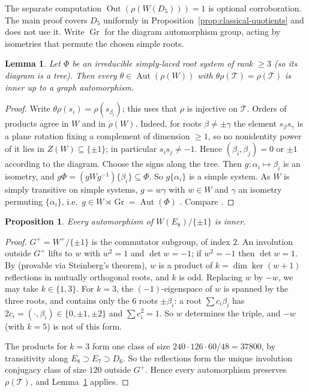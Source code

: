 \documentclass[11pt]{article}
\newtheorem{lemma}[theorem]{Lemma}
\newtheorem{proposition}[theorem]{Proposition}
\theoremstyle{definition}
\newcommand{\T}{\mathcal{T}}
\newcommand{\Aut}{\operatorname{Aut}}
\newcommand{\Out}{\operatorname{Out}}
\newcommand{\Gr}{\operatorname{Gr}}
\begin{document}
The separate computation $\Out(\rho(W(D_5)))=1$ is optional corroboration.
The main proof covers $D_5$ uniformly in Proposition~\ref{prop:classical-quotients} and does not use it.
Write $\Gr$ for the diagram automorphism group, acting by isometries that permute the chosen simple roots.

\begin{lemma}\label{lem:sign}
Let $\Phi$ be an irreducible simply-laced root system of rank $\ge3$ (so its diagram is a tree). Then every
$\theta\in\Aut(\rho(W))$ with $\theta\rho(\T)=\rho(\T)$ is inner up to a graph automorphism.
\end{lemma}
\begin{proof}
Write $\theta\rho(s_i)=\rho(s_{\beta_i})$; this uses that $\rho$ is injective on $\T$. Orders of products agree in $W$
and in $\rho(W)$. Indeed, for roots $\beta\ne\pm\gamma$ the element $s_\beta s_\gamma$ is a plane rotation fixing a
complement of dimension $\ge1$, so no nonidentity power of it lies in $Z(W)\subseteq\{\pm1\}$; in particular
$s_is_j\ne-1$. Hence $(\beta_i,\beta_j)=0$ or $\pm1$ according to the diagram. Choose the signs along the tree. Then $g\colon\alpha_i\mapsto\beta_i$ is an isometry, and
$g\Phi=(gWg^{-1})\{\beta_i\}\subseteq\Phi$. So $g\{\alpha_i\}$ is a simple system. As $W$ is simply transitive on simple systems, $g=w\gamma$ with $w\in W$ and
$\gamma$ an isometry permuting $\{\alpha_i\}$, i.e.\ $g\in W\rtimes\Gr=\Aut(\Phi)$ \cite[\S1.8, p.~15]{Hum90}. Compare
\cite[Thm.~18, Cor.~19]{FH03}.
\end{proof}

\begin{proposition}\label{prop:E8}
Every automorphism of $W(E_8)/\{\pm1\}$ is inner.
\end{proposition}
\begin{proof}
$G^+=W^+/\{\pm1\}$ is the commutator subgroup, of index $2$. An involution outside $G^+$ lifts to $w$ with $w^2=1$
and $\det w=-1$; if $w^2=-1$ then $\det w=1$. By \cite[Lemma~5, p.~5]{Car72} (provable via Steinberg's theorem), $w$ is a product of $k=\dim\ker(w+1)$ reflections in
mutually orthogonal roots, and $k$ is odd. Replacing $w$ by $-w$, we may take $k\in\{1,3\}$. For $k=3$, the
$(-1)$-eigenspace of $w$ is spanned by the three roots, and contains only the $6$ roots $\pm\beta_i$: a root
$\sum c_i\beta_i$ has $2c_i=(\cdot,\beta_i)\in\{0,\pm1,\pm2\}$ and $\sum c_i^2=1$. So $w$ determines the triple,
and $-w$ (with $k=5$) is not of this form.

The products for $k=3$ form one class of size $240\cdot126\cdot60/48=37800$, by transitivity along
$E_8\supset E_7\supset D_6$. So the reflections form the unique involution conjugacy class of size $120$ outside $G^+$. Hence every
automorphism preserves $\rho(\T)$, and Lemma~\ref{lem:sign} applies.
\end{proof}
\end{document}
